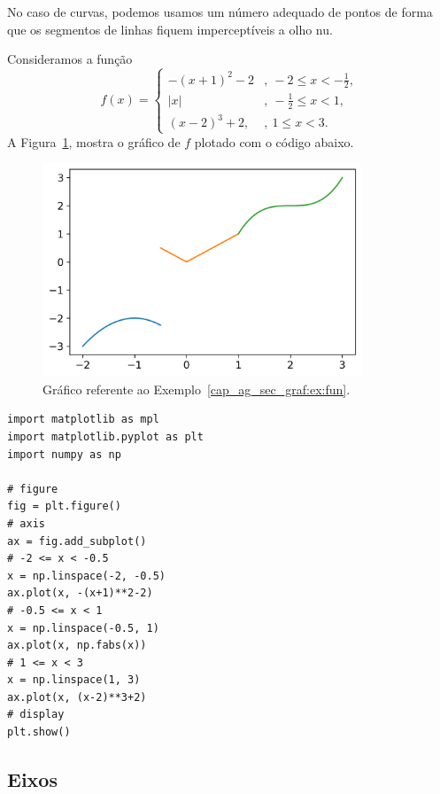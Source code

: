 No caso de curvas, podemos usamos um número adequado de pontos de forma que os segmentos de linhas fiquem imperceptíveis a olho nu.

\begin{ex}\label{cap_ag_sec_graf:ex:fun}
  Consideramos a função
  \begin{equation}
    f(x) = \left\{
      \begin{array}{ll}
        -(x+1)^2-2 &, ~-2\leq x < -\frac{1}{2},\\
        |x| &, ~-\frac{1}{2}\leq x < 1,\\
        (x-2)^3 + 2, &, ~1\leq x < 3.
      \end{array}
    \right.
  \end{equation}
  A Figura~\ref{cap_ag_sec_graf:fig:fun}, mostra o gráfico de $f$ plotado com o código abaixo.

  \begin{figure}[H]
    \centering
    \includegraphics[width=3.75in]{./cap_ag/dados/fig_fun/fig.png}
    \caption{Gráfico referente ao Exemplo~\ref{cap_ag_sec_graf:ex:fun}.}
    \label{cap_ag_sec_graf:fig:fun}
  \end{figure}  

\begin{lstlisting}
import matplotlib as mpl
import matplotlib.pyplot as plt
import numpy as np

# figure
fig = plt.figure()
# axis
ax = fig.add_subplot()
# -2 <= x < -0.5
x = np.linspace(-2, -0.5)
ax.plot(x, -(x+1)**2-2)
# -0.5 <= x < 1
x = np.linspace(-0.5, 1)
ax.plot(x, np.fabs(x))
# 1 <= x < 3
x = np.linspace(1, 3)
ax.plot(x, (x-2)**3+2)
# display
plt.show()
\end{lstlisting}

\end{ex}

\subsection{Eixos}

